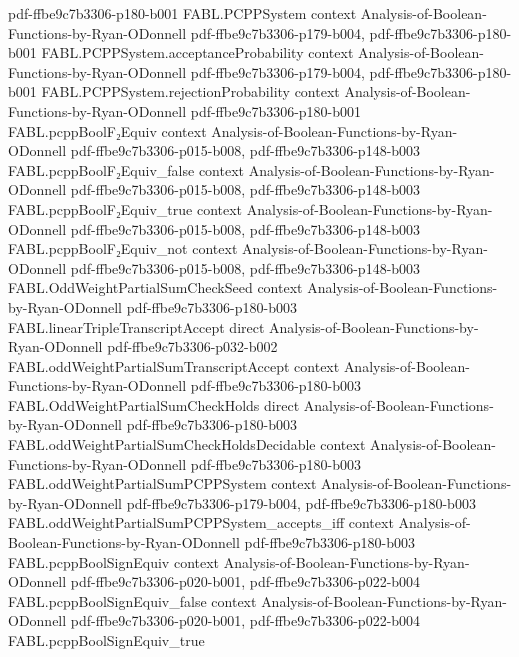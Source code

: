 \begin{theorem}
{    pdf-ffbe9c7b3306-p180-b001}
\proofstep
  {FABL.PCPPSystem}
  {context}
  {Analysis-of-Boolean-Functions-by-Ryan-ODonnell}
  {pdf-ffbe9c7b3306-p179-b004,
    pdf-ffbe9c7b3306-p180-b001}
\proofstep
  {FABL.PCPPSystem.acceptanceProbability}
  {context}
  {Analysis-of-Boolean-Functions-by-Ryan-ODonnell}
  {pdf-ffbe9c7b3306-p179-b004,
    pdf-ffbe9c7b3306-p180-b001}
\proofstep
  {FABL.PCPPSystem.rejectionProbability}
  {context}
  {Analysis-of-Boolean-Functions-by-Ryan-ODonnell}
  {pdf-ffbe9c7b3306-p180-b001}
\proofstep
  {FABL.pcppBoolF₂Equiv}
  {context}
  {Analysis-of-Boolean-Functions-by-Ryan-ODonnell}
  {pdf-ffbe9c7b3306-p015-b008,
    pdf-ffbe9c7b3306-p148-b003}
\proofstep
  {FABL.pcppBoolF₂Equiv_false}
  {context}
  {Analysis-of-Boolean-Functions-by-Ryan-ODonnell}
  {pdf-ffbe9c7b3306-p015-b008,
    pdf-ffbe9c7b3306-p148-b003}
\proofstep
  {FABL.pcppBoolF₂Equiv_true}
  {context}
  {Analysis-of-Boolean-Functions-by-Ryan-ODonnell}
  {pdf-ffbe9c7b3306-p015-b008,
    pdf-ffbe9c7b3306-p148-b003}
\proofstep
  {FABL.pcppBoolF₂Equiv_not}
  {context}
  {Analysis-of-Boolean-Functions-by-Ryan-ODonnell}
  {pdf-ffbe9c7b3306-p015-b008,
    pdf-ffbe9c7b3306-p148-b003}
\proofstep
  {FABL.OddWeightPartialSumCheckSeed}
  {context}
  {Analysis-of-Boolean-Functions-by-Ryan-ODonnell}
  {pdf-ffbe9c7b3306-p180-b003}
\proofstep
  {FABL.linearTripleTranscriptAccept}
  {direct}
  {Analysis-of-Boolean-Functions-by-Ryan-ODonnell}
  {pdf-ffbe9c7b3306-p032-b002}
\proofstep
  {FABL.oddWeightPartialSumTranscriptAccept}
  {context}
  {Analysis-of-Boolean-Functions-by-Ryan-ODonnell}
  {pdf-ffbe9c7b3306-p180-b003}
\proofstep
  {FABL.OddWeightPartialSumCheckHolds}
  {direct}
  {Analysis-of-Boolean-Functions-by-Ryan-ODonnell}
  {pdf-ffbe9c7b3306-p180-b003}
\proofstep
  {FABL.oddWeightPartialSumCheckHoldsDecidable}
  {context}
  {Analysis-of-Boolean-Functions-by-Ryan-ODonnell}
  {pdf-ffbe9c7b3306-p180-b003}
\proofstep
  {FABL.oddWeightPartialSumPCPPSystem}
  {context}
  {Analysis-of-Boolean-Functions-by-Ryan-ODonnell}
  {pdf-ffbe9c7b3306-p179-b004,
    pdf-ffbe9c7b3306-p180-b003}
\proofstep
  {FABL.oddWeightPartialSumPCPPSystem_accepts_iff}
  {context}
  {Analysis-of-Boolean-Functions-by-Ryan-ODonnell}
  {pdf-ffbe9c7b3306-p180-b003}
\proofstep
  {FABL.pcppBoolSignEquiv}
  {context}
  {Analysis-of-Boolean-Functions-by-Ryan-ODonnell}
  {pdf-ffbe9c7b3306-p020-b001,
    pdf-ffbe9c7b3306-p022-b004}
\proofstep
  {FABL.pcppBoolSignEquiv_false}
  {context}
  {Analysis-of-Boolean-Functions-by-Ryan-ODonnell}
  {pdf-ffbe9c7b3306-p020-b001,
    pdf-ffbe9c7b3306-p022-b004}
\proofstep
  {FABL.pcppBoolSignEquiv_true}

\end{theorem}
